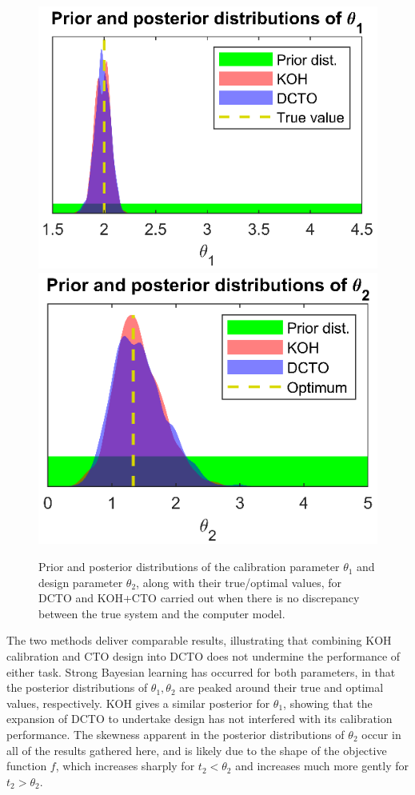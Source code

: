 \documentclass[12pt]{article}
\begin{document}
\begin{figure}
\centering
\includegraphics[scale=0.85]{FIG_dual_calib_post_theta1-d0}
\includegraphics[scale=0.85]{FIG_dual_calib_post_theta2-d0}
\captionsetup{width=.85\linewidth}
\caption{Prior and posterior distributions of the calibration parameter $\theta_1$ and design parameter $\theta_2$, along with their true/optimal values, for DCTO and KOH+CTO carried out when there is no discrepancy between the true system and the computer model.}
\label{fig:no_discrep_results}
\end{figure}
%
The two methods deliver comparable results, illustrating that combining KOH calibration and CTO design into DCTO does not undermine the performance of either task.
%
Strong Bayesian learning has occurred for both parameters, in that the posterior distributions of $\theta_1,\theta_2$ are peaked around their true and optimal values, respectively.
%
KOH gives a similar posterior for $\theta_1$, showing that the expansion of DCTO to undertake design has not interfered with its calibration performance.
%
The skewness apparent in the posterior distributions of $\theta_2$ occur in all of the results gathered here, and is likely due to the shape of the objective function $f$, which increases sharply for $t_2<\theta_2$ and increases much more gently for $t_2>\theta_2$.
%
\end{document}
